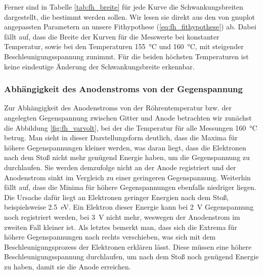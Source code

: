 \documentclass[11pt, a4paper]{article}
\begin{document}
\begin{table}[h]
\centering

\caption{Messwerte der Schwankungsbreite für variable $\Delta U$ bei \SI{160}{\degreeCelsius} bzw. variable Temperatur bei $\Delta U=\SI{2}{\volt}$}
\label{tab:fh_breite}
\end{table}
Ferner sind in Tabelle \ref{tab:fh_breite} für jede Kurve die Schwankungsbreiten dargestellt, die bestimmt werden sollen.
Wir lesen sie direkt aus den von gnuplot angepassten Parametern an unsere Fithypothese (\ref{eq:fh_fithypothese}) ab.
Dabei fällt auf, dass die Breite der Kurven für die Messwerte bei konstanter Temperatur, sowie bei den Temperaturen \SI{155}{\degreeCelsius} und \SI{160}{\degreeCelsius}, mit steigender Beschleunigungsspannung zunimmt.
Für die beiden höchsten Temperaturen ist keine eindeutige Änderung der Schwankungsbreite erkennbar.

\subsubsection{Abhängigkeit des Anodenstroms von der Gegenspannung}

Zur Abhängigkeit des Anodenstroms von der Röhrentemperatur bzw. der angelegten Gegenspannung zwischen Gitter und Anode betrachten wir zunächst die Abbildung \ref{fig:fh_varvolt}, bei der die Temperatur für alle Messungen \SI{160}{\degreeCelsius} betrug.
Man sieht in dieser Darstellungsform deutlich, dass die Maxima für höhere Gegenspannungen kleiner werden, was daran liegt, dass die Elektronen nach dem Stoß nicht mehr genügend Energie haben, um die Gegenspannung zu durchlaufen.
Sie werden demzufolge nicht an der Anode registriert und der Anodenstrom sinkt im Vergleich zu einer geringeren Gegenspannung.
Weiterhin fällt auf, dass die Minima für höhere Gegenspannungen ebenfalls niedriger liegen.
Die Ursache dafür liegt an Elektronen geringer Energien nach dem Stoß, beispielsweise \SI{2.5}{\electronvolt}.
Ein Elektron dieser Energie kann bei \SI{2}{\volt} Gegenspannung noch registriert werden, bei \SI{3}{\volt} nicht mehr, weswegen der Anodenstrom im zweiten Fall kleiner ist.
Als letztes bemerkt man, dass sich die Extrema für höhere Gegenspannungen nach rechts verschieben, was sich mit dem Beschleunigungsprozess der Elektronen erklären lässt.
Diese müssen eine höhere Beschleunigungsspannung durchlaufen, um nach dem Stoß noch genügend Energie zu haben, damit sie die Anode erreichen.
\end{document}
